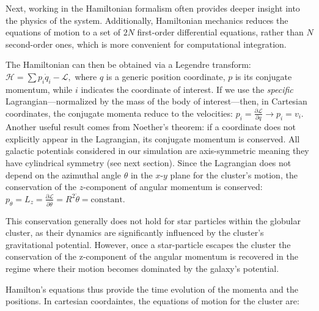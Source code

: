         Next, working in the Hamiltonian formalism often provides deeper insight into the physics of the system. Additionally, Hamiltonian mechanics reduces the equations of motion to a set of \(2N\) first-order differential equations, rather than \(N\) second-order ones, which is more convenient for computational integration.

        The Hamiltonian can then be obtained via a Legendre transform: \(\mathcal{H} = \sum p_i \dot{q}_i - \mathcal{L},\) where $q$ is a generic position coordinate, $p$ is its conjugate momentum, while $i$ indicates the coordinate of interest. If we use the \textit{specific} Lagrangian—normalized by the mass of the body of interest—then, in Cartesian coordinates, the conjugate momenta reduce to the velocities: $p_i=\frac{\partial \mathcal{L}}{\partial q} \rightarrow p_i = v_i$. Another useful result comes from Noether's theorem: if a coordinate does not explicitly appear in the Lagrangian, its conjugate momentum is conserved. All galactic potentials considered in our simulation are axis-symmetric meaning they have cylindrical symmetry (see next section). Since the Lagrangian does not depend on the azimuthal angle \( \theta \) in the \(x\text{-}y\) plane for the cluster's motion, the conservation of the \(z\)-component of angular momentum is conserved: $p_\theta = L_z = \frac{\partial \mathcal{L}}{\partial \dot{\theta}} = R^2 \dot{\theta} = \mathrm{constant.}$

        This conservation generally does not hold for star particles within the globular cluster, as their dynamics are significantly influenced by the cluster's gravitational potential. However, once a star-particle escapes the cluster the conservation of the z-component of the angular momentum is recovered in the regime where their motion becomes dominated by the galaxy's potential. 

        Hamilton's equations thus provide the time evolution of the momenta and the positions. In cartesian coordaintes, the equations of motion for the cluster are: 

